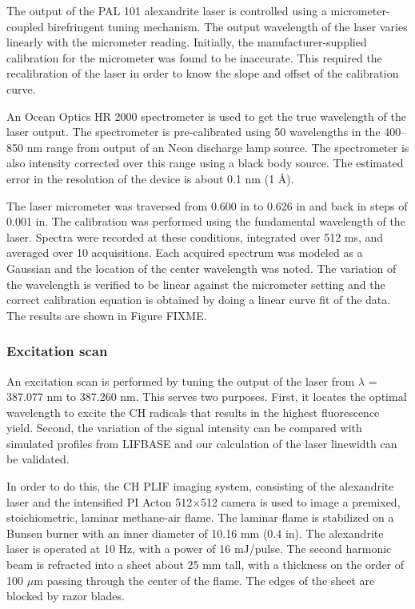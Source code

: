 The output of the PAL 101 alexandrite laser is controlled using a micrometer-coupled birefringent tuning mechanism.
The output wavelength of the laser varies linearly with the micrometer reading.
Initially, the manufacturer-supplied calibration for the micrometer was found to be inaccurate.
This required the recalibration of the laser in order to know the slope and offset of the calibration curve.

An Ocean Optics HR 2000 spectrometer is used to get the true wavelength of the laser output.
The spectrometer is pre-calibrated using 50 wavelengths in the 400--850 nm range from output of an Neon discharge lamp source.
The spectrometer is also intensity corrected over this range using a black body source.
The estimated error in the resolution of the device is about 0.1 nm (1 \AA).

The laser micrometer was traversed from 0.600 in to 0.626 in and back in steps of 0.001 in.
The calibration was performed using the fundamental wavelength of the laser.
Spectra were recorded at these conditions, integrated over 512 ms, and averaged over 10 acquisitions.
Each acquired spectrum was modeled as a Gaussian and the location of the center wavelength was noted.
The variation of the wavelength is verified to be linear against the micrometer setting and the correct calibration equation is obtained by doing a linear curve fit of the data.
The results are shown in Figure FIXME.

\subsubsection{Excitation scan}

An excitation scan is performed by tuning the output of the laser from \(\lambda\) = 387.077 nm to 387.260 nm.
This serves two purposes.
First, it locates the optimal wavelength to excite the CH radicals that results in the highest fluorescence yield.
Second, the variation of the signal intensity can be compared with simulated profiles from LIFBASE and our calculation of the laser linewidth can be validated.

In order to do this, the CH PLIF imaging system, consisting of the alexandrite laser and the intensified PI Acton 512\(\times\)512 camera is used to image a premixed, stoichiometric, laminar methane-air flame.
The laminar flame is stabilized on a Bunsen burner with an inner diameter of 10.16 mm (0.4 in).
The alexandrite laser is operated at 10 Hz, with a power of 16 mJ/pulse.
The second harmonic beam is refracted into a sheet about 25 mm tall, with a thickness on the order of 100 \(\mu\)m passing through the center of the flame.
The edges of the sheet are blocked by razor blades.

